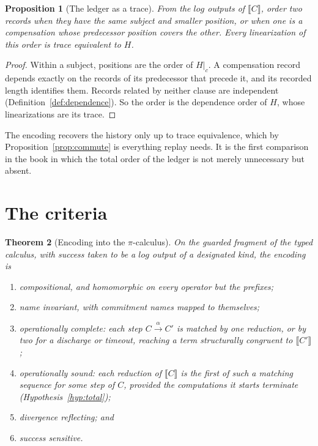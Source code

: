 \documentclass[11pt,openany]{book}
\newtheorem{theorem}{Theorem}[chapter]
\newtheorem{proposition}[theorem]{Proposition}
\theoremstyle{remark}
\begin{document}
\begin{proposition}[The ledger as a trace]\label{prop:pitrace}
From the $\mathit{log}$ outputs of $\llbracket C\rrbracket$, order two
records when they have the same subject and smaller position, or when one
is a compensation whose predecessor position covers the other. Every
linearization of this order is trace equivalent to $H$.
\end{proposition}

\begin{proof}
Within a subject, positions are the order of $H|_c$. A compensation record
depends exactly on the records of its predecessor that precede it, and
its recorded length identifies them. Records related by neither clause are
independent (Definition~\ref{def:dependence}). So the order is the
dependence order of $H$, whose linearizations are its trace.
\end{proof}

The encoding recovers the history only up to trace equivalence, which by
Proposition~\ref{prop:commute} is everything replay needs. It is the first
comparison in the book in which the total order of the ledger is not
merely unnecessary but absent.

\section{The criteria}

\begin{theorem}[Encoding into the $\pi$-calculus]\label{thm:pienc}
On the guarded fragment of the typed calculus, with success taken to be a
$\mathit{log}$ output of a designated kind, the encoding is
\begin{enumerate}[label=(\roman*)]
\item compositional, and homomorphic on every operator but the prefixes;
\item name invariant, with commitment names mapped to themselves;
\item operationally complete: each step $C\xrightarrow{\alpha}C'$ is
matched by one reduction, or by two for a discharge or timeout, reaching a
term structurally congruent to $\llbracket C'\rrbracket$;
\item operationally sound: each reduction of $\llbracket C\rrbracket$ is
the first of such a matching sequence for some step of $C$, provided the
computations it starts terminate (Hypothesis~\ref{hyp:total});
\item divergence reflecting; and
\item success sensitive.
\end{enumerate}
\end{theorem}
\end{document}
